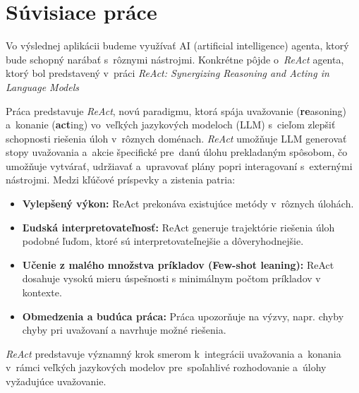 \chapter{Súvisiace práce}

Vo výslednej aplikácii budeme využívať AI (artificial intelligence) agenta, ktorý bude schopný narábať s~rôznymi nástrojmi. Konkrétne pôjde o~\textit{ReAct} agenta, ktorý bol predstavený v~práci \textit{ReAct: Synergizing Reasoning and Acting in Language Models}~\cite{reactpaper}

Práca predstavuje \textit{ReAct}, novú paradigmu, ktorá spája uvažovanie (\textbf{re}asoning) a~konanie (\textbf{act}ing) vo~veľkých jazykových modeloch (LLM) s~cieľom zlepšiť schopnosti riešenia úloh v~rôznych doménach. \textit{ReAct} umožňuje LLM generovať stopy uvažovania a~akcie špecifické pre~danú úlohu prekladaným spôsobom, čo umožňuje vytvárať, udržiavať a~upravovať plány popri interagovaní s~externými nástrojmi. 
Medzi kľúčové príspevky a zistenia patria:

\begin{itemize}
\item \textbf{Vylepšený výkon:} ReAct prekonáva existujúce metódy v~rôznych úlohách.
\item \textbf{Ľudská interpretovateľnosť:} ReAct generuje trajektórie riešenia úloh podobné ľuďom, ktoré sú interpretovateľnejšie a dôveryhodnejšie.
\item \textbf{Učenie z malého množstva príkladov (Few-shot leaning):} ReAct dosahuje vysokú mieru úspešnosti s minimálnym počtom príkladov v kontexte.
\item \textbf{Obmedzenia a budúca práca:} Práca upozorňuje na výzvy, napr. chyby chyby pri uvažovaní a navrhuje možné riešenia.
\end{itemize}

\textit{ReAct} predstavuje významný krok smerom k~integrácii uvažovania a~konania v~rámci veľkých jazykových modelov pre~spoľahlivé rozhodovanie a~úlohy vyžadujúce uvažovanie.
